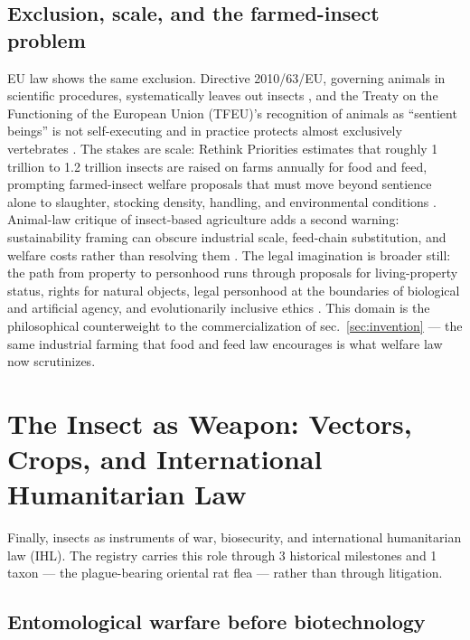 \documentclass[
  english,
]{article}
\begin{document}
\subsection{Exclusion, scale, and the farmed-insect
problem}\label{exclusion-scale-and-the-farmed-insect-problem}

EU law shows the same exclusion. Directive 2010/63/EU, governing animals
in scientific procedures, systematically leaves out insects
\citep{eudir2010_63}, and the Treaty on the Functioning of the European
Union (TFEU)'s recognition of animals as ``sentient beings'' is not
self-executing and in practice protects almost exclusively vertebrates
\citep{tfeu_art13}. The stakes are scale: Rethink Priorities estimates
that roughly 1 trillion to 1.2 trillion insects are raised on farms
annually for food and feed, prompting farmed-insect welfare proposals
that must move beyond sentience alone to slaughter, stocking density,
handling, and environmental conditions
\citep{rethink_farmed_insects, vanhuis2021welfare, barrett2023farmed_insect_welfare}.
Animal-law critique of insect-based agriculture adds a second warning:
sustainability framing can obscure industrial scale, feed-chain
substitution, and welfare costs rather than resolving them
\citep{reddy2024insect_agriculture}. The legal imagination is broader
still: the path from property to personhood runs through proposals for
living-property status, rights for natural objects, legal personhood at
the boundaries of biological and artificial agency, and evolutionarily
inclusive ethics
\citep{favre2010living_property, stone1972trees, rowe2025insect_ai_personhood, mikhalevich2020minds}.
This domain is the philosophical counterweight to the commercialization
of sec.~\ref{sec:invention} --- the same industrial farming that food
and feed law encourages is what welfare law now scrutinizes.

\newpage

\section{The Insect as Weapon: Vectors, Crops, and International
Humanitarian Law}\label{sec:weapon}

Finally, insects as instruments of war, biosecurity, and international
humanitarian law (IHL). The registry carries this role through 3
historical milestones and 1 taxon --- the plague-bearing oriental rat
flea --- rather than through litigation.

\subsection{Entomological warfare before
biotechnology}\label{entomological-warfare-before-biotechnology}
\end{document}
